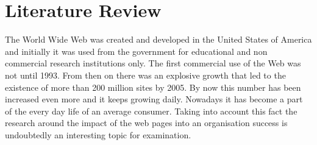 \documentclass{article}
\begin{document}
\section{Literature Review }
The World Wide Web was created and developed in the United States of America and initially it was used from the government for educational and non commercial research institutions only. The first commercial use of the Web was not until 1993.\cite{key1} From then on there was an explosive growth that led to the existence of more than 200 million sites by 2005.\cite{key3} By now this number has been increased even more and it keeps growing daily. Nowadays it has become a part of the every day life of an average consumer. Taking into account this fact the research around the impact of the web pages into an organisation success is undoubtedly an interesting topic for examination.
\end{document}
